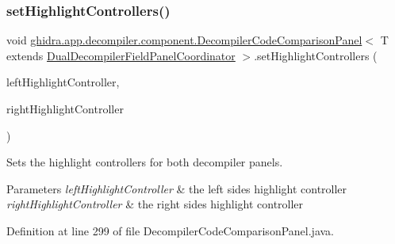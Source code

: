 \subsubsection{\texorpdfstring{setHighlightControllers()}{setHighlightControllers()}}
{\footnotesize\ttfamily void \mbox{\hyperlink{classghidra_1_1app_1_1decompiler_1_1component_1_1_decompiler_code_comparison_panel}{ghidra.\+app.\+decompiler.\+component.\+Decompiler\+Code\+Comparison\+Panel}}$<$ T extends \mbox{\hyperlink{classghidra_1_1app_1_1decompiler_1_1component_1_1_dual_decompiler_field_panel_coordinator}{Dual\+Decompiler\+Field\+Panel\+Coordinator}} $>$.set\+Highlight\+Controllers (\begin{DoxyParamCaption}\item[{\mbox{\hyperlink{classghidra_1_1app_1_1decompiler_1_1component_1_1_clang_highlight_controller}{Clang\+Highlight\+Controller}}}]{left\+Highlight\+Controller,  }\item[{\mbox{\hyperlink{classghidra_1_1app_1_1decompiler_1_1component_1_1_clang_highlight_controller}{Clang\+Highlight\+Controller}}}]{right\+Highlight\+Controller }\end{DoxyParamCaption})\hspace{0.3cm}{\ttfamily [inline]}}

Sets the highlight controllers for both decompiler panels. 
\begin{DoxyParams}{Parameters}
{\em left\+Highlight\+Controller} & the left side\textquotesingle{}s highlight controller \\
\hline
{\em right\+Highlight\+Controller} & the right side\textquotesingle{}s highlight controller \\
\hline
\end{DoxyParams}


Definition at line 299 of file Decompiler\+Code\+Comparison\+Panel.\+java.

